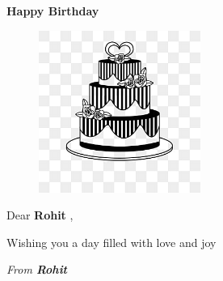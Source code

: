 \documentclass{article}%
\begin{document}
%
\normalsize%
\begin{center}%
\begin{Large}%
\textbf{Happy Birthday}%
\end{Large}%
\vspace*{0.5cm}%
\par%


\begin{figure}[h!]%
\centering%
\includegraphics[width=200px]{cake.jpg}%
\end{figure}

%
\par%
\vspace*{0.5cm}%
\begin{Large}%
Dear %
\textbf{Rohit}%
,%
\end{Large}%
\par%
\vspace*{0.5cm}%
Wishing you a day filled with love and joy%
\par%
\vspace*{0.5cm}%
\textit{From \textbf{Rohit}}%
\par%
\vspace*{0.5cm}%
\end{center}%
\end{document}
